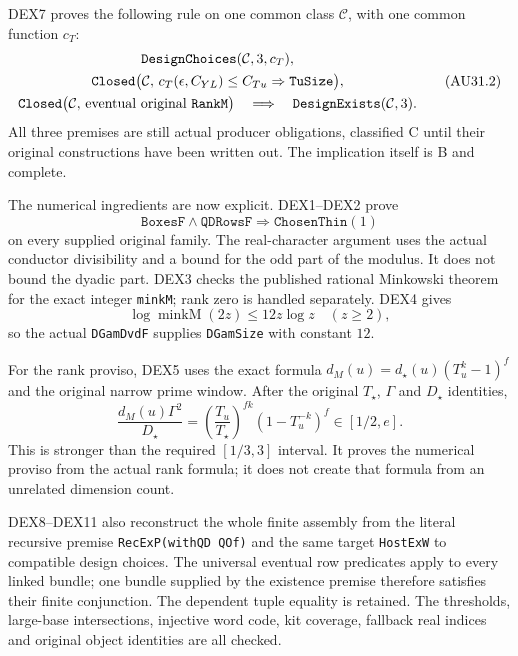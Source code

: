 DEX7 proves the following rule on one common class $\mathcal C$,
with one common function $c_T$:
\[
\begin{gathered}
\texttt{DesignChoices}(\mathcal C,3,c_T),\\
\texttt{Closed}\bigl(\mathcal C,\,
c_T(\epsilon,C_{YL})\le C_{Tu}\Rightarrow\texttt{TuSize}\bigr),\\
\texttt{Closed}\bigl(\mathcal C,\,
\hbox{eventual original }\texttt{RankM}\bigr)
\quad\Longrightarrow\quad
\texttt{DesignExists}(\mathcal C,3).
\end{gathered}                                                   \tag{AU31.2}
\]
All three premises are still actual producer obligations, classified
C until their original constructions have been written out.
The implication itself is B and complete.

The numerical ingredients are now explicit. DEX1--DEX2 prove
\[
\texttt{BoxesF}\wedge\texttt{QDRowsF}
                 \Longrightarrow\texttt{ChosenThin}(1)
                                                               \tag{AU31.3}
\]
on every supplied original family. The real-character argument uses
the actual conductor divisibility and a bound for the odd part of
the modulus. It does not bound the dyadic part.
DEX3 checks the published rational Minkowski theorem for the exact
integer \texttt{minkM}; rank zero is handled separately.
DEX4 gives
\[
 \log\operatorname{minkM}(2z)\le12z\log z\quad(z\ge2),
\]
so the actual \texttt{DGamDvdF} supplies \texttt{DGamSize} with
constant $12$.

For the rank proviso, DEX5 uses the exact formula
$d_M(u)=d_\star(u)(T_u^k-1)^f$ and the original narrow prime window.
After the original $T_\star$, $\Gamma$ and $D_\star$ identities,
\[
\frac{d_M(u)\Gamma^2}{D_\star}
 =\left(\frac{T_u}{T_\star}\right)^{fk}(1-T_u^{-k})^f
 \in[1/2,e].
                                                               \tag{AU31.4}
\]
This is stronger than the required $[1/3,3]$ interval.
It proves the numerical proviso from the actual rank formula;
it does not create that formula from an unrelated dimension count.

DEX8--DEX11 also reconstruct the whole finite assembly from the
literal recursive premise \texttt{RecExP(withQD QOf)} and the same
target \texttt{HostExW} to compatible design choices.
The universal eventual row predicates apply to every linked bundle;
one bundle supplied by the existence premise therefore satisfies
their finite conjunction. The dependent tuple equality is retained.
The thresholds, large-base intersections, injective word code,
kit coverage, fallback real indices and original object identities
are all checked.

